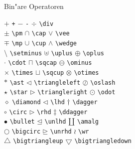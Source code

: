 \begin{table}[!htbp]
\caption{Bin"are Operatoren}
\begin{symbols}
$+$   \> \verb|+|   \>$-$    \> \verb|-| \> $\div $\> \verb|\div| \\
$\pm $\> \verb|\pm| \>$\cap $\> \verb|\cap| \>$\vee $\> \verb|\vee| \\
$\mp $\> \verb|\mp| \>$\cup $\> \verb|\cup| \>$\wedge $\> \verb|\wedge| \\
$\setminus $\> \verb|\setminus| \>$\uplus $\> \verb|\uplus| \>
$\oplus $\> \verb|\oplus| \\
$\cdot $\> \verb|\cdot| \>$\sqcap $\> \verb|\sqcap| \>
$\ominus $\> \verb|\ominus| \\
$\times $\> \verb|\times| \>$\sqcup $\> \verb|\sqcup| \>
$\otimes $\> \verb|\otimes| \\
$\ast $\> \verb|\ast| \>$\triangleleft $\> \verb|\triangleleft| \>
$\oslash $\> \verb|\oslash| \\
$\star $\> \verb|\star| \>$\triangleright $\> \verb|\triangleright| \>
$\odot $\> \verb|\odot| \\
$\diamond $\> \verb|\diamond| \>$\lhd $\> \verb|\lhd|\footnotemark[1] \>
$\dagger $\> \verb|\dagger| \\
$\circ $\> \verb|\circ| \>$\rhd $\> \verb|\rhd|\footnotemark[1] \>
$\ddagger $\> \verb|\ddagger| \\
$\bullet $\> \verb|\bullet| \>$\unlhd $\> \verb|\unlhd|\footnotemark[1] \>
$\amalg $\> \verb|\amalg| \\
$\bigcirc $\> \verb|\bigcirc| \> $\unrhd$ \> \verb|\unrhd|\footnotemark[1] \> 
$\wr$ \> \verb|\wr| \\
$\bigtriangleup$ \>\verb|\bigtriangleup| \>
$\bigtriangledown$ \> \verb|\bigtriangledown|\>\\
\end{symbols}
\end{table}


